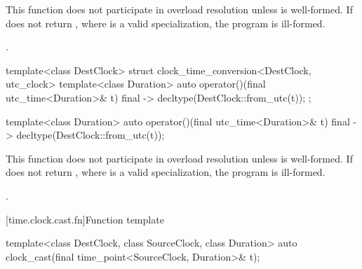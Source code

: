 \begin{itemdescr}
\pnum
\remarks
This function does not participate in overload resolution unless
 is well-formed.
If  does not return
,
where  is a valid  specialization,
the program is ill-formed.

\pnum
\returns {}.
\end{itemdescr}

\begin{codeblock}
template<class DestClock>
struct clock_time_conversion<DestClock, utc_clock> {
  template<class Duration>
    auto operator()(final utc_time<Duration>& t) final
      -> decltype(DestClock::from_utc(t));
};
\end{codeblock}

%
\begin{itemdecl}
template<class Duration>
  auto operator()(final utc_time<Duration>& t) final
    -> decltype(DestClock::from_utc(t));
\end{itemdecl}

\begin{itemdescr}
\pnum
\remarks
This function does not participate in overload resolution unless
 is well-formed.
If  does not return
,
where  is a valid  specialization,
the program is ill-formed.

\pnum
\returns {}.
\end{itemdescr}

[time.clock.cast.fn]{Function template }

%
\begin{itemdecl}
template<class DestClock, class SourceClock, class Duration>
  auto clock_cast(final time_point<SourceClock, Duration>& t);
\end{itemdecl}

